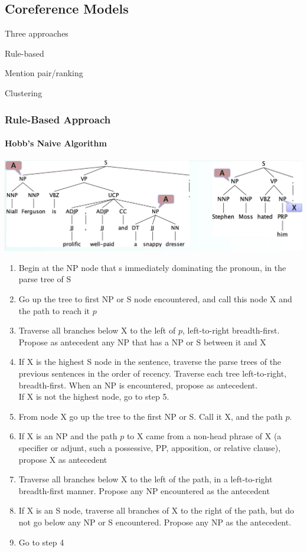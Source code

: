 \documentclass[10pt]{report}
\begin{document}
\subsection{Coreference Models}
Three approaches
\begin{list}{}{}
	\item Rule-based
	\item Mention pair/ranking
	\item Clustering
\end{list}
\subsubsection{Rule-Based Approach}
\paragraph{Hobb's Naive Algorithm}
\begin{center}
	\includegraphics[scale=0.5]{103.png}
\end{center}
\pagebreak
\begin{enumerate}
	\item Begin at the NP node that s immediately dominating the pronoun, in the parse tree of S
	\item Go up the tree to first NP or S node encountered, and call this node X and the path to reach it $p$
	\item Traverse all branches below X to the left of $p$, left-to-right breadth-first.\\
	Propose as antecedent any NP that has a NP or S between it and X
	\item If X is the highest S node in the sentence, traverse the parse trees of the previous sentences in the order of recency. Traverse each tree left-to-right, breadth-first. When an NP is encountered, propose as antecedent.\\
	If X is not the highest node, go to step 5.
	\item From node X go up the tree to the first NP or S. Call it X, and the path $p$.
	\item If X is an NP and the path $p$ to X came from a non-head phrase of X (a specifier or adjunt, such a possessive, PP, apposition, or relative clause), propose X as antecedent
	\item Traverse all branches below X to the left of the path, in a left-to-right breadth-first manner. Propose any NP encountered as the antecedent
	\item If X is an S node, traverse all branches of X to the right of the path, but do not go below any NP or S encountered. Propose any NP as the antecedent.
	\item Go to step 4
\end{enumerate}
\end{document}
